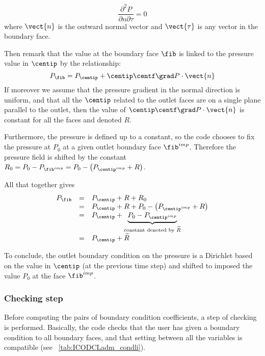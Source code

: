 \begin{equation*}
\displaystyle\frac{\partial^2 P}{\partial n \partial \tau } = 0
\end{equation*}
where $\vect{n}$ is the outward normal vector and  $\vect{\tau}$ is any 
vector in the boundary face.

Then remark that the value at the boundary face $\fib$ is linked
to the pressure value in $\centip$ by the relationship:
\begin{equation*}
P_\fib = P_\centip + \centip\centf \grad P \cdot \vect{n}
\end{equation*}
If moreover we assume that the pressure gradient in the normal direction
is uniform, and that all the $\centip$ related to the outlet faces are on 
a single plane parallel to the outlet, then the value of $\centip\centf \grad P \cdot \vect{n} $
is constant for all the faces and denoted $R$. 

Furthermore, the pressure is defined up to a constant, so the code
chooses to fix the pressure at $P_0$ at a given outlet boundary face 
$\fib^{imp}$. Therefore the pressure field is shifted  by the constant
$R_0=P_0- P_{\fib^{imp}} = P_0 - \left( P_{{\centip}^{imp}}+R \right)$.

All that together gives
\begin{equation}\label{Base_Condli_eq_psortie_condli}
\begin{array}{rcl}
P_\fib &=& P_{\centip}+R+R_0\\
   &=& P_{\centip}+R+P_0- \left( P_{{\centip}^{imp}}+R \right)\\
   &=&P_{\centip} +\underbrace{P_0-P_{{\centip}^{imp}}}_{\text{constant denoted by $\widetilde{R}$}}\\
   &=&P_{\centip} + \widetilde{R}
\end{array}
\end{equation}

To conclude, the outlet boundary condition on the pressure is a Dirichlet based on 
the value in $\centip$ (at the previous time step) and shifted to imposed
the value $P_0$ at the face $\fib^{imp}$.

\subsubsection{Checking step}

 Before computing the pairs of boundary condition coefficients, a step of checking is performed. Basically, 
the code checks that the user has given a boundary condition to all boundary faces, and that 
setting between all the variables is compatible (see \tablename~\ref{tab:ICODCLadm_condli}).



